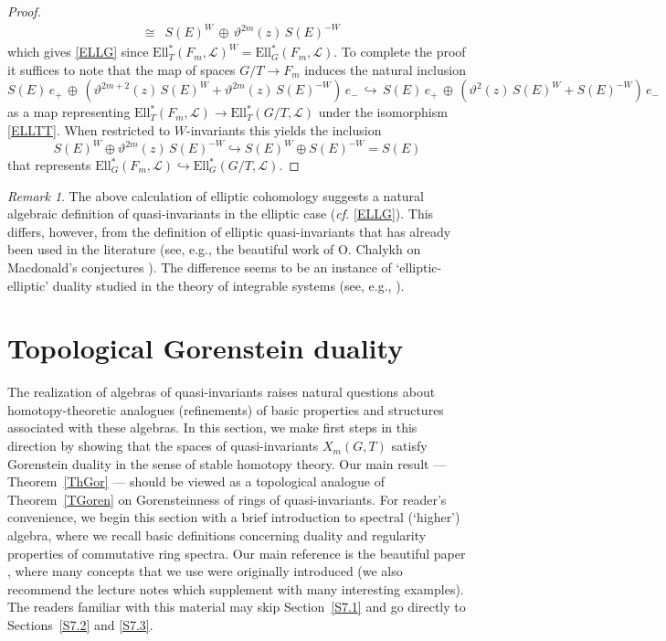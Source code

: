 \documentclass[11pt]{amsart}
\theoremstyle{definition}
\theoremstyle{remark}
\newtheorem{remark}[theorem]{Remark}
\numberwithin{equation}{section}
\newcommand{\la}{\label}
\newcommand{\into}{\hookrightarrow}
\def\cL{\mathscr{
L}}
\def\ELL{\mathrm{Ell}}
\begin{document}
\begin{proof}
\begin{eqnarray*}
& \cong & 
S(E)^W \, \oplus \, \vartheta^{2m}(z)\,S(E)^{-W}
\end{eqnarray*}
%
which gives  \eqref{ELLG} since $ \ELL_T^*(F_m, \cL)^W = \ELL_G^*(F_m, \cL)$. To complete the proof it suffices to note that the map of spaces $ G/T  \to F_m $ induces the natural inclusion
%
$$
S(E)\,e_+ \,\oplus\,(\vartheta^{2m+2}(z)\, S(E)^W +  \vartheta^{2m}(z)\,S(E)^{-W})\,e_{-} 
 \,\into\,
S(E)\,e_+\,\oplus\, (\vartheta^{2}(z)\,S(E)^W  + S(E)^{-W})\,e_{-} 
$$
%
as a map representing  $\ELL_T^*(F_m, {\mathscr L}) \to \ELL_T^*(G/T, \cL)$ under the isomorphism \eqref{ELLTT}.
When restricted to $W$-invariants this yields the inclusion
$$
S(E)^W  \oplus \vartheta^{2m}(z)\,S(E)^{-W} \into S(E)^W \oplus S(E)^{-W} = S(E) 
$$
%
that represents $\ELL_G^*(F_m, {\mathscr L})\into \ELL_G^*(G/T, \cL)$.
\end{proof}
%
\begin{remark}
\la{RemEll}
The above calculation of elliptic cohomology suggests a natural algebraic definition of
quasi-invariants in the elliptic case ({\it cf.} \eqref{ELLG}). This differs, however, 
from the definition of elliptic quasi-invariants that has already been used in the literature (see, e.g., the beautiful work of O. Chalykh on Macdonald's conjectures \cite{Ch02}). The 
difference seems to be an instance of `elliptic-elliptic' duality studied in the theory of integrable systems (see, e.g., \cite{KS19}).
\end{remark}


\section{Topological Gorenstein duality}
\la{S8}
%
The realization of algebras of quasi-invariants raises natural questions about homotopy-theoretic analogues (refinements) of basic properties and structures associated with these algebras. In this section, we make first steps in this direction by showing that the spaces of quasi-invariants $ X_m(G,T) $  satisfy Gorenstein duality in the sense of stable homotopy theory. Our main result --- Theorem~\ref{ThGor} --- should be viewed as a 
topological analogue of Theorem~\ref{TGoren} on Gorensteinness of rings of quasi-invariants.
For reader's convenience, we begin this section with a brief introduction to spectral (`higher') algebra, where we recall basic definitions concerning  duality and regularity properties of commutative ring spectra. Our main reference is the beautiful paper \cite{DGI06}, where many concepts that we use were originally introduced (we also recommend the lecture notes \cite{G18} which supplement \cite{DGI06} with many interesting examples). The readers familiar with this material may skip Section~\ref{S7.1} and go directly to Sections~\ref{S7.2} and \ref{S7.3}.
\end{document}
